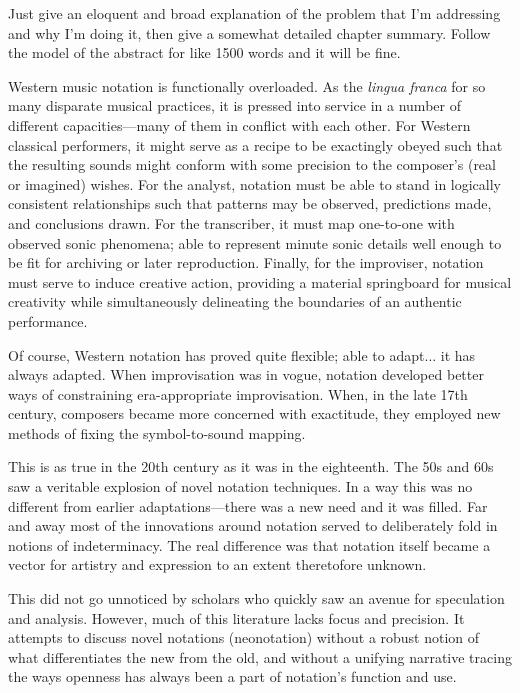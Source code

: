 Just give an eloquent and broad explanation of the problem that I'm addressing and why I'm doing it, then give a somewhat detailed chapter summary. Follow the model of the abstract for like 1500 words and it will be fine.

Western music notation is functionally overloaded. As the \textit{lingua franca} for so many disparate musical practices, it is pressed into service in a number of different capacities---many of them in conflict with each other. For Western classical performers, it might serve as a recipe to be exactingly obeyed such that the resulting sounds might conform with some precision to the composer's (real or imagined) wishes. For the analyst, notation must be able to stand in logically consistent relationships such that patterns may be observed, predictions made, and conclusions drawn. For the transcriber, it must map one-to-one with observed sonic phenomena; able to represent minute sonic details well enough to be fit for archiving or later reproduction. Finally, for the improviser, notation must serve to induce creative action, providing a material springboard for musical creativity while simultaneously delineating the boundaries of an authentic performance.

Of course, Western notation has proved quite flexible; able to adapt... it has always adapted. When improvisation was in vogue, notation developed better ways of constraining era-appropriate improvisation. When, in the late 17th century, composers became more concerned with exactitude, they employed new methods of fixing the symbol-to-sound mapping.

This is as true in the 20th century as it was in the eighteenth. 
The 50s and 60s saw a veritable explosion of novel notation techniques.
In a way this was no different from earlier adaptations---there was a new need and it was filled.
Far and away most of the innovations around notation served to deliberately fold in notions of indeterminacy.
The real difference was that notation itself became a vector for artistry and expression to an extent theretofore unknown.

This did not go unnoticed by scholars who quickly saw an avenue for speculation and analysis. However, much of this literature lacks focus and precision. It attempts to discuss novel notations (neonotation) without a robust notion of what differentiates the new from the old, and without a unifying narrative tracing the ways openness has always been a part of notation's function and use.

